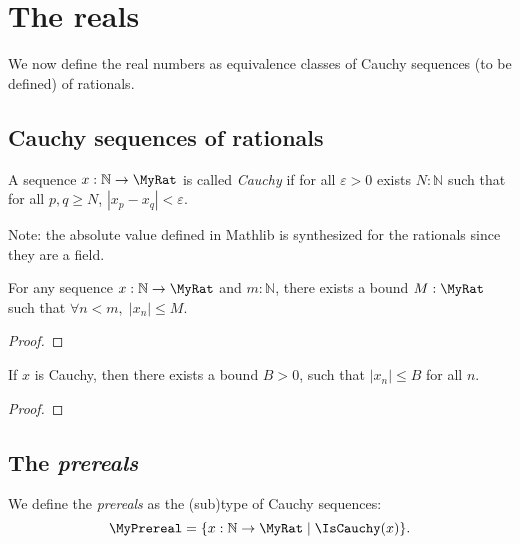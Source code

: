 \chapter{The reals}

We now define the real numbers as equivalence classes of Cauchy sequences (to be defined) of rationals.

\section{Cauchy sequences of rationals}

\begin{definition}
    \label{IsCauchy}
    \leanok
    A sequence $x : \mathbb{N} \to \MyRat$ is called \emph{Cauchy} if for all $\varepsilon > 0$ exists $N : \mathbb{N}$ such that for all $p, q \ge N$, $\left|x_p - x_q\right| < \varepsilon$.

    Note: the absolute value defined in Mathlib is synthesized for the rationals since they are a field.
\end{definition}

\begin{lemma}
    \label{exists_forall_abs_initial_le}
    \leanok
    For any sequence $x : \mathbb{N} \to \MyRat$ and $m : \mathbb{N}$, there exists a bound $M : \MyRat$
    such that $\forall n < m, \; |x_n| \leq M$.
\end{lemma}
\begin{proof}
    \leanok
\end{proof}

\begin{lemma}
    \label{IsCauchy.bounded}
    \leanok
    If $x$ is Cauchy, then there exists a bound $B > 0$, such that $|x_n| \leq B$ for all $n$.
\end{lemma}
\begin{proof}
    \leanok
\end{proof}

\section{The \emph{prereals}}

\begin{definition}
    \label{MyPrereal}
    \leanok
    We define the \emph{prereals} as the (sub)type of Cauchy sequences:
    \[
    \MyPrereal = \{ x : \mathbb{N} \to \MyRat \mid \IsCauchy(x) \}.
    \]
\end{definition}

